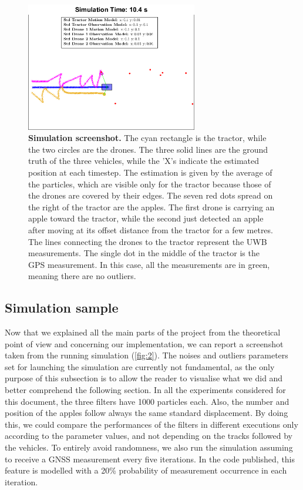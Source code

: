 \documentclass[letterpaper,twocolumn,10pt]{article}
\begin{document}
\begin{figure}[!htp]
    \centering
     \includegraphics[width=7.5cm]{images/screenshot_example.png}
     \caption{\textbf{Simulation screenshot.} The cyan rectangle is the tractor, while the two circles are the drones. The three solid lines are the ground truth of the three vehicles, while the 'X's indicate the estimated position at each timestep. The estimation is given by the average of the particles, which are visible only for the tractor because those of the drones are covered by their edges. The seven red dots spread on the right of the tractor are the apples. The first drone is carrying an apple toward the tractor, while the second just detected an apple after moving at its offset distance from the tractor for a few metres. The lines connecting the drones to the tractor represent the UWB measurements. The single dot in the middle of the tractor is the GPS measurement. In this case, all the measurements are in green, meaning there are no outliers.  }
    \label{fig:2}
\end{figure}

\subsection*{Simulation sample}
Now that we explained all the main parts of the project from the theoretical point of view and concerning our implementation, we can report a screenshot taken from the running simulation (\autoref{fig:2}). The noises and outliers parameters set for launching the simulation are currently not fundamental, as the only purpose of this subsection is to allow the reader to visualise what we did and better comprehend the following section. In all the experiments considered for this document, the three filters have 1000 particles each. Also, the number and position of the apples follow always the same standard displacement. By doing this, we could compare the performances of the filters in different executions only according to the parameter values, and not depending on the tracks followed by the vehicles. To entirely avoid randomness, we also run the simulation assuming to receive a GNSS measurement every five iterations. In the code published, this feature is modelled with a 20\% probability of measurement occurrence in each iteration. 
\end{document}
